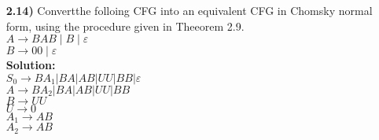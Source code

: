 \documentclass[12pt]{letter}
\newcommand\tab[1][2cm]{\hspace*{#1}}
\begin{document}
\begin{enumerate}
\item[\textbf{2.14)}] Convertthe folloing CFG into an equivalent CFG in Chomsky normal form, using the procedure given in Theeorem 2.9.\\
	\tab \tab $A \rightarrow BAB \mid B \mid \varepsilon$ \\
	\tab \tab $B \rightarrow 00 \mid \varepsilon$ \\
\textbf{Solution:} \\
	\tab $S_0 \rightarrow BA_1 |BA|AB|UU|BB| \varepsilon $ \\ 
	\tab $A \rightarrow BA_2 | BA |AB |UU |BB $ \\
	\tab $B \rightarrow UU $ \\ 
	\tab $U \rightarrow 0 $ \\ 
	\tab $A_1 \rightarrow AB $ \\
	\tab $A_2 \rightarrow AB $ \\


\end{enumerate}
\end{document}
